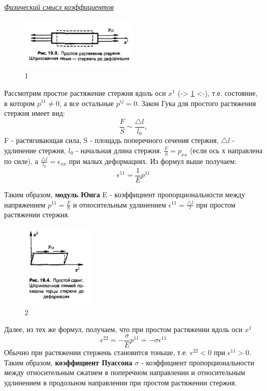 \begin{center}
	\textit{\underline{Физический смысл коэффициентов}}
\end{center}
\begin{figure}
\includegraphics[width=0.5\textwidth]{pic1.JPG}
\caption{1}
\label{ris:image1}
\end{figure}
\quad Рассмотрим простое растяжение стержня вдоль оси $x^1$ (-> \ref{ris:image1} <-), т.е. состояние, в котором $p^{11}\neq0$, а все остальные $p^{ij}=0$. Закон Гука для простого растяжения стержня имеет вид: $$\frac{F}{S} \sim \frac{\triangle l}{l_0} ,$$
F - растягивающая сила, S - площадь поперечного сечения стержня, $\triangle l$ - удлинение стержня, $l_0$ - начальная длина стержня. $\frac{F}{S} = p_{xx}$ (если ось х направлена по силе), а $\frac{\triangle l}{l_0} = \epsilon_{xx}$ при малых деформациях. Из формул выше получаем: $$\epsilon^{11} = \frac{1}{E}p^{11}$$

Таким образом, \textbf{модуль Юнга} E - коэффициент пропорциональности между напряжением $p^{11}=\frac{F}{S}$ и относительным удлинением $\epsilon^{11}=\frac{\triangle l}{l}$ при простом растяжении стержня.
\begin{figure}
\includegraphics[width=0.3\textwidth]{pic2.JPG}
\caption{\label{ris:image2}2}
\end{figure}
Далее, из тех же формул, получаем, что при простом растяжении вдоль оси $x^1$ $$\epsilon^{22} = -\frac{\sigma}{E}p^{11}=-\sigma \epsilon^{11}$$
Обычно при растяжении стержень становится тоньше, т.е. $\epsilon^{22} < 0$ при $\epsilon^{11} > 0$. Таким образом, \textbf{коэффициент Пуассона} $\sigma$ - коэффициент пропорциональности между относительным сжатием в поперечном направлении и относительным удлинением в продольном направлении при простом растяжении стержня.

